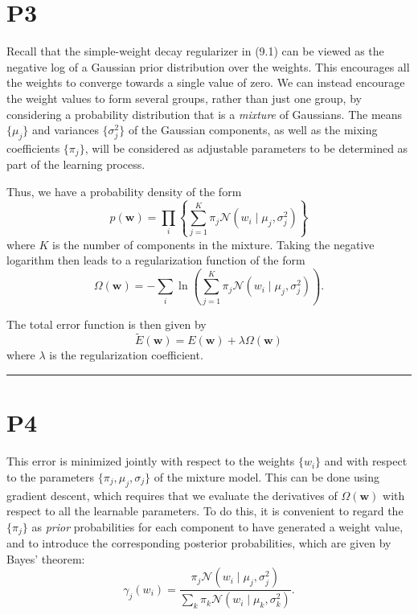 \documentclass{article}
\begin{document}
\section{P3}

Recall that the simple-weight decay regularizer in (9.1) can be viewed as the negative log of a Gaussian prior distribution over the weights. This encourages all the weights to converge towards a single value of zero. We can instead encourage the weight values to form several groups, rather than just one group, by considering a probability distribution that is a \emph{mixture} of Gaussians. The means $\{\mu_j\}$ and variances $\{\sigma_j^2\}$ of the Gaussian components, as well as the mixing coefficients $\{\pi_j\}$, will be considered as adjustable parameters to be determined as part of the learning process.

Thus, we have a probability density of the form
\begin{equation}
p(\mathbf{w}) = \prod_i \left\{ \sum_{j=1}^K \pi_j \mathcal{N}(w_i \mid \mu_j, \sigma_j^2) \right\}
\tag{9.21}
\end{equation}
where $K$ is the number of components in the mixture. Taking the negative logarithm then leads to a regularization function of the form
\begin{equation}
\Omega(\mathbf{w}) = - \sum_i \ln \left( \sum_{j=1}^K \pi_j \mathcal{N}(w_i \mid \mu_j, \sigma_j^2) \right).
\tag{9.22}
\end{equation}

The total error function is then given by
\begin{equation}
\widetilde{E}(\mathbf{w}) = E(\mathbf{w}) + \lambda \Omega(\mathbf{w})
\tag{9.23}
\end{equation}
where $\lambda$ is the regularization coefficient.

\noindent\rule{\linewidth}{0.4pt}

\section{P4}

This error is minimized jointly with respect to the weights $\{w_i\}$ and with respect to the parameters $\{\pi_j, \mu_j, \sigma_j\}$ of the mixture model. This can be done using gradient descent, which requires that we evaluate the derivatives of $\Omega(\mathbf{w})$ with respect to all the learnable parameters. To do this, it is convenient to regard the $\{\pi_j\}$ as \emph{prior} probabilities for each component to have generated a weight value, and to introduce the corresponding posterior probabilities, which are given by Bayes' theorem:
\begin{equation}
\gamma_j(w_i) = \frac{\pi_j \mathcal{N}(w_i \mid \mu_j, \sigma_j^2)}{\sum_k \pi_k \mathcal{N}(w_i \mid \mu_k, \sigma_k^2)}.
\tag{9.24}
\end{equation}
\end{document}
